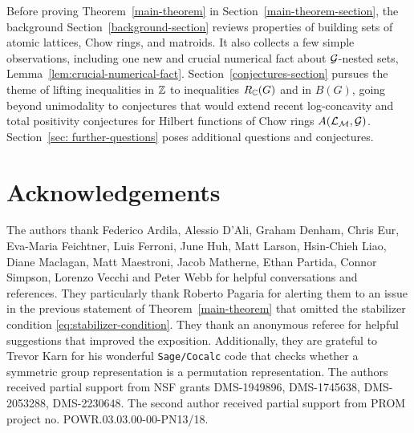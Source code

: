 Before proving Theorem~\ref{main-theorem} in Section~\ref{main-theorem-section}, the background Section~\ref{background-section} reviews properties of building sets of atomic lattices, Chow rings, and matroids. It also collects a few simple observations,
including one new and crucial numerical fact about $\mathcal{G}$-nested sets, Lemma~\ref{lem:crucial-numerical-fact}.
Section~\ref{conjectures-section} pursues the theme of lifting inequalities in $\mathbb{Z}$ to inequalities $R_{\mathbb{C}}(G)$ and in $B(G)$, going beyond unimodality to conjectures that would extend recent log-concavity and total positivity conjectures for Hilbert functions of Chow rings $A(\mathcal{L}_{\mathcal{M}}, \mathcal{G})$.
Section~\ref{sec: further-questions} poses additional questions
and conjectures.



\section*{Acknowledgements}
The authors thank Federico Ardila, Alessio D'Ali, Graham Denham, Chris Eur, Eva-Maria Feichtner, Luis Ferroni, June Huh, Matt Larson, Hsin-Chieh Liao,  Diane Maclagan, Matt Maestroni, Jacob Matherne, Ethan Partida, Connor Simpson, Lorenzo Vecchi and Peter Webb for helpful conversations and references.  They particularly thank Roberto Pagaria for
alerting them to an issue in the previous statement of Theorem~\ref{main-theorem} that omitted the stabilizer condition \eqref{eq:stabilizer-condition}. 
They thank an anonymous referee for helpful suggestions that improved the exposition.  Additionally, they are grateful to Trevor Karn for his wonderful {\tt Sage/Cocalc} code that checks whether a symmetric group representation is a permutation representation.  The authors received partial support from NSF grants 
DMS-1949896, DMS-1745638, DMS-2053288, DMS-2230648. The second author received partial support from PROM project no. POWR.03.03.00-00-PN13/18.




